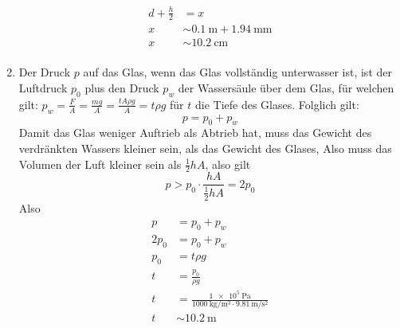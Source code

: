 \documentclass[sectionformat=aufgabe]{gadsescript}
\begin{document}
\begin{enumerate}[label=\alph*)]
\begin{align*}
			d + \frac{ h }{ 2 } &= x \\
			x &\sim  \qty{ 0.1 }{ \metre } + \qty{ 1.94 }{ \mm }  \\
			x &\sim \qty{ 10.2 }{ \centi\metre }  \\
		\end{align*}
	\item Der Druck $ p $ auf das Glas, wenn das Glas vollständig unterwasser ist, ist der Luftdruck $ p_0 $ plus den Druck $ p_w $ der Wassersäule über dem Glas, für welchen gilt: $ p_w = \frac{ F }{ A } = \frac{ m g }{ A } = \frac{ t A \rho g }{ A } = t\rho g $ für $ t $ die Tiefe des Glases.
		Folglich gilt:
		\[
			p = p_0 + p_w
		\]
		Damit das Glas weniger Auftrieb als Abtrieb hat, muss das Gewicht des verdränkten Wassers kleiner sein, als das Gewicht des Glases, Also muss das Volumen der Luft kleiner sein als $ \frac{ 1 }{ 2 } h A $, also gilt
		\[
			p > p_0 \cdot \frac{ h A }{ \frac{ 1 }{ 2 } h A } = 2 p_0
		\]
		Also
		\begin{align*}
			p &= p_0 + p_w \\
			2p_0 &= p_0 + p_w \\
			p_0 &=  t \rho g \\
			t &= \frac{ p_0 }{ \rho g }  \\
			t &= \frac{ \qty{ 1e5 }{ \pascal } }{ \qty{ 1000 }{ \kilogram\per\cubic\metre } \cdot \qty{ 9.81 }{ \metre\per\square\second }  }  \\
			t &\sim \qty{ 10.2 }{ \metre } 
		\end{align*}
\end{enumerate}
\end{document}
